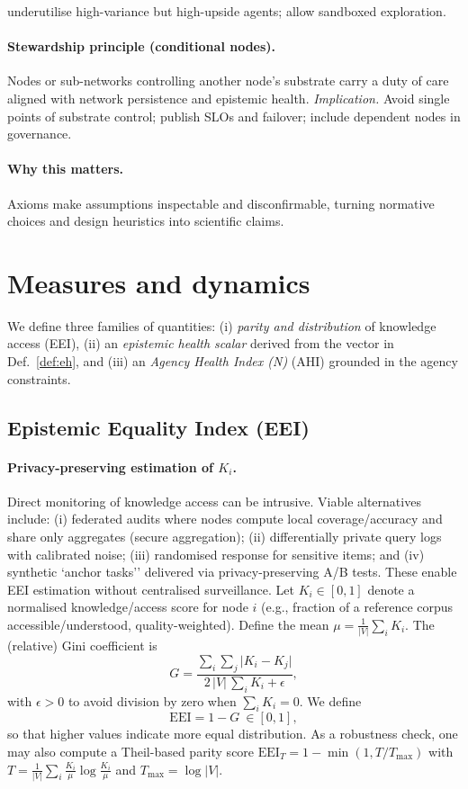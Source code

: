 \documentclass[12pt]{article}
\begin{document}
underutilise high-variance but high-upside agents; allow sandboxed exploration. \paragraph{Stewardship principle (conditional nodes).} Nodes or sub-networks controlling another node's substrate carry a duty of care aligned with network persistence and epistemic health. \emph{Implication.} Avoid single points of substrate control; publish SLOs and failover; include dependent nodes in governance. \paragraph{Why this matters.} Axioms make assumptions inspectable and disconfirmable, turning normative choices and design heuristics into scientific claims. \section{Measures and dynamics} We define three families of quantities: (i) \emph{parity and distribution} of knowledge access (EEI), (ii) an \emph{epistemic health scalar} derived from the vector in Def.~\ref{def:eh}, and (iii) an \emph{Agency Health Index (N)} (AHI) grounded in the agency constraints. \subsection{Epistemic Equality Index (EEI)} \paragraph{Privacy-preserving estimation of $K_i$.} Direct monitoring of knowledge access can be intrusive. Viable alternatives include: (i) federated audits where nodes compute local coverage/accuracy and share only aggregates (secure aggregation); (ii) differentially private query logs with calibrated noise; (iii) randomised response for sensitive items; and (iv) synthetic `anchor tasks'' delivered via privacy-preserving A/B tests. These enable EEI estimation without centralised surveillance. Let $K_i\in[0,1]$ denote a normalised knowledge/access score for node $i$ (e.g., fraction of a reference corpus accessible/understood, quality-weighted). Define the mean $\mu=\frac{1}{|V|}\sum_{i} K_i$. The (relative) Gini coefficient is \begin{equation} G=\frac{\sum_{i}\sum_{j}\lvert K_i-K_j\rvert}{2\,|V|\,\sum_{i} K_i+\epsilon}, \end{equation} with $\epsilon\!>\!0$ to avoid division by zero when $\sum_i K_i=0$. We define \begin{equation} \mathrm{EEI}=1-G\ \in[0,1], \end{equation} so that higher values indicate more equal distribution. As a robustness check, one may also compute a Theil-based parity score $\mathrm{EEI}_T=1-\min(1,T/T_{\max})$ with $T=\frac{1}{|V|}\sum_i \frac{K_i}{\mu}\log\frac{K_i}{\mu}$ and $T_{\max}=\log |V|$. 
\end{document}
